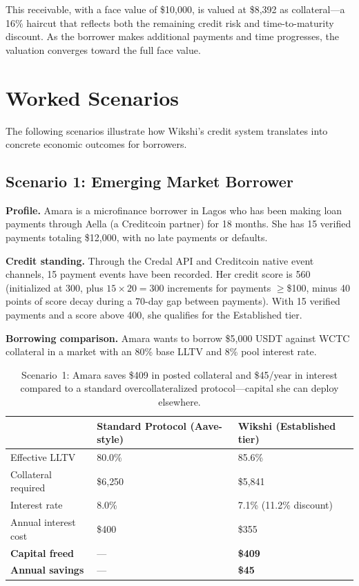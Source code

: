\documentclass[11pt,a4paper]{article}
\begin{document}
This receivable, with a face value of \$10{,}000, is valued at \$8{,}392 as collateral---a 16\% haircut that reflects both the remaining credit risk and time-to-maturity discount. As the borrower makes additional payments and time progresses, the valuation converges toward the full face value.

\section{Worked Scenarios}

The following scenarios illustrate how Wikshi's credit system translates into concrete economic outcomes for borrowers.

\subsection{Scenario 1: Emerging Market Borrower}

\textbf{Profile.} Amara is a microfinance borrower in Lagos who has been making loan payments through Aella (a Creditcoin partner) for 18 months. She has 15 verified payments totaling \$12{,}000, with no late payments or defaults.

\textbf{Credit standing.} Through the Credal API and Creditcoin native event channels, 15 payment events have been recorded. Her credit score is 560 (initialized at 300, plus $15 \times 20 = 300$ increments for payments $\geq$\$100, minus 40 points of score decay during a 70-day gap between payments). With 15 verified payments and a score above 400, she qualifies for the Established tier.

\textbf{Borrowing comparison.} Amara wants to borrow \$5{,}000 USDT against WCTC collateral in a market with an 80\% base LLTV and 8\% pool interest rate.

\begin{table}[H]
\centering
{}
\begin{tabularx}{\textwidth}{l X X}
\toprule
& \textbf{Standard Protocol (Aave-style)} & \textbf{Wikshi (Established tier)} \\
\midrule
Effective LLTV & 80.0\% & 85.6\% \\
Collateral required & \$6{,}250 & \$5{,}841 \\
Interest rate & 8.0\% & 7.1\% (11.2\% discount) \\
Annual interest cost & \$400 & \$355 \\
\textbf{Capital freed} & --- & \textbf{\$409} \\
\textbf{Annual savings} & --- & \textbf{\$45} \\
\bottomrule
\end{tabularx}
\caption{Scenario~1: Amara saves \$409 in posted collateral and \$45/year in interest compared to a standard overcollateralized protocol---capital she can deploy elsewhere.}
\label{tab:scenario1}
\end{table}
\end{document}
